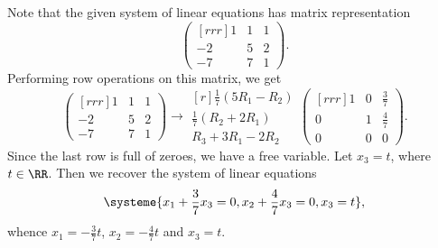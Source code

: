 \begin{solution}
\begin{ppart}
        Note that the given system of linear equations has matrix representation \[\begin{pmatrix}[rrr]1 & 1 & 1 \\ -2 & 5 & 2 \\ -7 & 7 & 1\end{pmatrix}.\] Performing row operations on this matrix, we get \[\begin{pmatrix}[rrr]1 & 1 & 1 \\ -2 & 5 & 2 \\ -7 & 7 & 1\end{pmatrix} \rightarrow \begin{matrix}[r] \scriptstyle \frac17(5R_1 - R_2) \\ \scriptstyle \frac17(R_2 + 2R_1) \\ \scriptstyle R_3 + 3R_1 - 2R_2 \end{matrix}\begin{pmatrix}[rrr]1 & 0 & \frac37 \\ 0 & 1 & \frac47 \\ 0 & 0 & 0\end{pmatrix}.\] Since the last row is full of zeroes, we have a free variable. Let $x_3 = t$, where $t \in \RR$. Then we recover the system of linear equations \[\systeme{x_1 + \frac37 x_3 = 0, x_2 + \frac47 x_3 = 0, x_3 = t},\] whence $x_1 = -\frac37 t$, $x_2 = -\frac47 t$ and $x_3 = t$.
    \end{ppart}
\end{solution}

